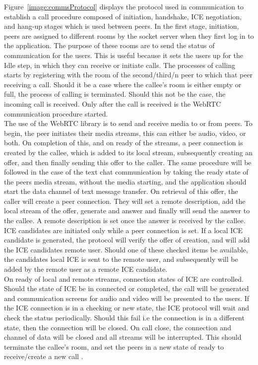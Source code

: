 Figure~\ref{image:commsProtocol} displays the protocol used in communication to establish a call procedure composed of initiation, handshake, ICE negotiation, and hang-up stages which is used between peers.
In the first stage, initiation, peers are assigned to different rooms by the socket server when they first log in to the application. The purpose of these rooms are to send the status of communication for the users. This is useful because it sets the users up for the Idle step, in which they can receive or initiate calls. The processes of calling starts by registering with the room of the second/third/n peer to which that peer receiving a call. Should it be a case where the callee’s room is either empty or full, the process of calling is terminated. Should this not be the case, the incoming call is received. Only after the call is received is the WebRTC communication procedure started. 
\\The use of the WebRTC library is to send and receive media to or from peers. To begin, the peer initiates their media streams, this can either be audio, video, or both. On completion of this, and on ready of the streams, a peer connection is created by the callee, which is added to its local stream, subsequently creating an offer, and then finally sending this offer to the caller. The same procedure will be followed in the case of the text chat communication by taking the ready state of the peers media stream, without the media starting, and the application should start the data channel of text message transfer. On retrieval of this offer, the caller will create a peer connection. They will set a remote description, add the local stream of the offer, generate and answer and finally will send the answer to the callee. A remote description is set once the answer is received by the callee. ICE candidates are initiated only while a peer connection is set. If a local ICE candidate is generated, the protocol will verify the offer of creation, and will add the ICE candidates remote user. Should one of these checked items be available, the candidates local ICE is sent to the remote user, and subsequently will be added by the remote user as a remote ICE candidate.
\\On ready of local and remote streams, connection states of ICE are controlled. Should the state of ICE be in connected or completed, the call will be generated  and communication screens for audio and video will be presented to the users. If the ICE connection is in a checking or new state, the ICE protocol will wait and check the status periodically. Should this fail i.e the connection is in a different state, then the connection will be closed.
On call close, the connection and channel of data will be closed and all streams will be interrupted. This should terminate the callee’s room, and set the peers in a new state of ready to receive/create a new call \cite{14003034520191201}.

